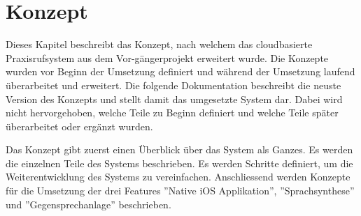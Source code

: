 \section{Konzept}

Dieses Kapitel beschreibt das Konzept, nach welchem das cloudbasierte Praxisrufsystem aus dem Vor-gängerprojekt erweitert wurde.
Die Konzepte wurden vor Beginn der Umsetzung definiert und während der Umsetzung laufend überarbeitet und erweitert.
Die folgende Dokumentation beschreibt die neuste Version des Konzepts und stellt damit das umgesetzte System dar.
Dabei wird nicht hervorgehoben, welche Teile zu Beginn definiert und welche Teile später überarbeitet oder ergänzt wurden.

Das Konzept gibt zuerst einen Überblick über das System als Ganzes.
Es werden die einzelnen Teile des Systems beschrieben.
Es werden Schritte definiert, um die Weiterentwicklung des Systems zu vereinfachen.
Anschliessend werden Konzepte für die Umsetzung der drei Features ''Native iOS Applikation'', ''Sprachsynthese'' und ''Gegensprechanlage'' beschrieben.





